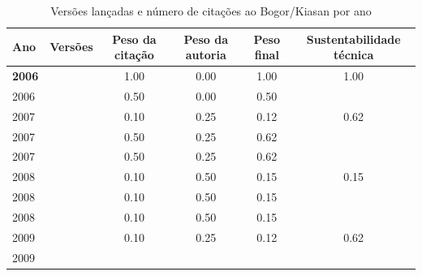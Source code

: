 \begin{table}[H]
\caption{Versões lançadas e número de citações ao Bogor/Kiasan por ano}
\centering
\begin{tabular}{| l | c | c | c | c | c |}
  \hline
  Ano & Versões & Peso da citação & Peso da autoria & Peso final & Sustentabilidade técnica \\
  \hline
            {\bf 2006}
          &
          
          &
          1.00
          &
          0.00
          &
          1.00
          &
            {\color{blue} 1.00}
          \\
            2006
          &
          
          &
          0.50
          &
          0.00
          &
          0.50
          &
          \\
\hline
            2007
          &
          
          &
          0.10
          &
          0.25
          &
          0.12
          &
            {\color{blue} 0.62}
          \\
            2007
          &
          
          &
          0.50
          &
          0.25
          &
          0.62
          &
          \\
            2007
          &
          
          &
          0.50
          &
          0.25
          &
          0.62
          &
          \\
\hline
            2008
          &
          
          &
          0.10
          &
          0.50
          &
          0.15
          &
            {\color{red} 0.15}
          \\
            2008
          &
          
          &
          0.10
          &
          0.50
          &
          0.15
          &
          \\
            2008
          &
          
          &
          0.10
          &
          0.50
          &
          0.15
          &
          \\
\hline
            2009
          &
          
          &
          0.10
          &
          0.25
          &
          0.12
          &
            {\color{blue} 0.62}
          \\
            2009
          &
          

\end{tabular}
\end{table}
